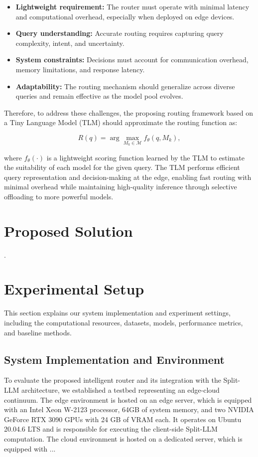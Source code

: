 \documentclass[lettersize,journal]{IEEEtran}
\begin{document}
\begin{itemize}
    \item \textbf{Lightweight requirement:} The router must operate with minimal latency and computational overhead, especially when deployed on edge devices.
    \item \textbf{Query understanding:} Accurate routing requires capturing query complexity, intent, and uncertainty.
    \item \textbf{System constraints:} Decisions must account for communication overhead, memory limitations, and response latency.
    \item \textbf{Adaptability:} The routing mechanism should generalize across diverse queries and remain effective as the model pool evolves.
\end{itemize}

Therefore, to address these challenges, the proposing routing framework based on a Tiny Language Model (TLM) should approximate the routing function as:

\begin{equation}
    R(q) = \arg\max_{M_k \in \mathcal{M}} f_{\theta}(q, M_k),
\end{equation}

where $f_{\theta}(\cdot)$ is a lightweight scoring function learned by the TLM to estimate the suitability of each model for the given query. The TLM performs efficient query representation and decision-making at the edge, enabling fast routing with minimal overhead while maintaining high-quality inference through selective offloading to more powerful models.

\section{Proposed Solution}
\label{sec:proposed}
.

\section{Experimental Setup}
\label{sec:experiment}
This section explains our system implementation and experiment settings, including the computational resources, datasets, models, performance metrics, and baseline methods.

\subsection{System Implementation and Environment}
To evaluate the proposed intelligent router and its integration with the Split-LLM architecture, we established a testbed representing an edge-cloud continuum. The edge environment is hosted on an edge server, which is equipped with an Intel Xeon W-2123 processor, 64GB of system memory, and two NVIDIA GeForce RTX 3090 GPUs with 24 GB of VRAM each. It operates on Ubuntu 20.04.6 LTS and is responsible for executing the client-side Split-LLM computation. The cloud environment is hosted on a dedicated server, which is equipped with ...
\end{document}
